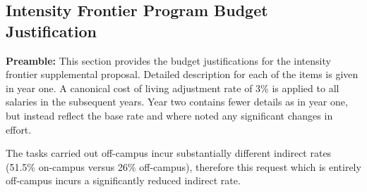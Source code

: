 \subsection*{\Large Intensity Frontier Program Budget Justification}
{\bf Preamble:} This section provides the budget justifications for the intensity frontier supplemental proposal.  Detailed description for each of the items is given in year one.  A canonical cost of living adjustment rate of 3\% is applied to all salaries in the subsequent years. Year two contains fewer details as in year one, but instead reflect the base rate and where noted any significant changes in effort.   

The tasks carried out off-campus incur substantially different indirect rates (51.5\% on-campus versus 26\% off-campus), therefore this request which is entirely off-campus incurs a significantly reduced indirect rate.   

